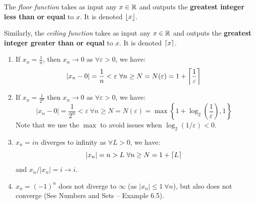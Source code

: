 \documentclass[../main.tex]{subfiles}
\begin{document}
\begin{definition}
  The \textit{floor function} takes as input any $x \in \mathbb{R}$ and outputs the \textbf{greatest integer less than or equal} to $x$.
  It is denoted $\left\lfloor x \right\rfloor$.

  Similarly, the \textit{ceiling function} takes as input any $x \in \mathbb{R}$ and outputs the \textbf{greatest integer greater than or equal} to $x$.
  It is denoted $\left\lceil x \right\rceil$.
\end{definition}
\begin{example}
  \begin{enumerate}
    \item If $x_n = \frac{1}{n}$, then $x_n \to 0$ as $\forall \varepsilon > 0$, we have:
      \[
        |x_n - 0| = \frac{1}{n} < \varepsilon\ \forall n \geq N = N(\varepsilon) = 1 + \left\lceil \frac{1}{\varepsilon} \right\rceil
      \]
    \item If $x_n = \frac{1}{2^{n}}$ then $x_n \to 0$ as $\forall \varepsilon > 0$, we have:
      \[
        |x_n - 0| = \frac{1}{2^{n}} < \varepsilon\ \forall n \geq N = N(\varepsilon) = \max\left\{1 + \log_2\left(\frac{1}{\varepsilon}\right), 1\right\}
      \]
      Note that we use the $\max$ to avoid issues when $\log_{2}(1/\varepsilon) < 0$.
    \item $x_n = i n$ diverges to infinity as $\forall L > 0$, we have:
      \[
        |x_n| = n > L\ \forall n \geq N = 1 + \left\lceil L \right\rceil
      \]
      and $x_n/|x_n| = i \to i$.
    \item $x_n = (-1)^{n}$ does not diverge to $\infty$ (as $|x_n| \leq 1\ \forall n$), but also does not converge (See Numbers and Sets -- Example 6.5).
  \end{enumerate}
\end{example}
\end{document}
